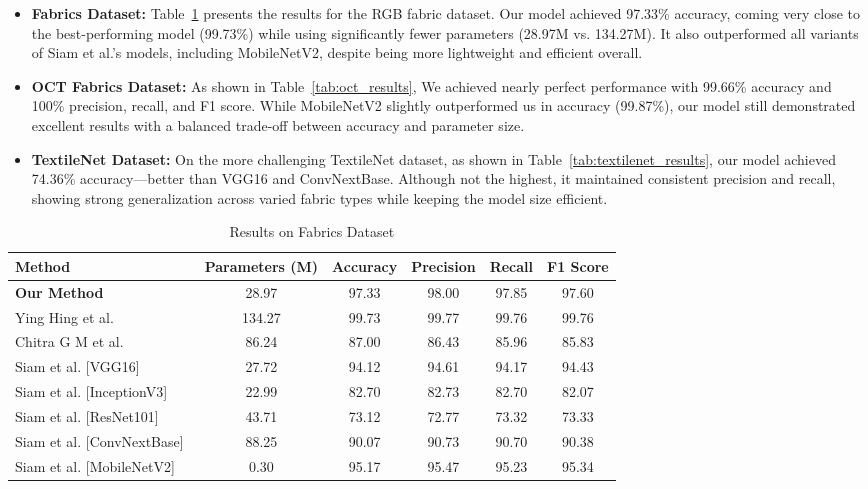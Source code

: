 \begin{itemize}[topsep=0pt, noitemsep]
    \item \textbf{Fabrics Dataset:} Table~\ref{tab:rgb_results} presents the results for the RGB fabric dataset. Our model achieved 97.33\% accuracy, coming very close to the best-performing model (99.73\%) while using significantly fewer parameters (28.97M vs. 134.27M). It also outperformed all variants of Siam et al.’s models, including MobileNetV2, despite being more lightweight and efficient overall.

    \item \textbf{OCT Fabrics Dataset:} As shown in Table~\ref{tab:oct_results}, We achieved nearly perfect performance with 99.66\% accuracy and 100\% precision, recall, and F1 score. While MobileNetV2 slightly outperformed us in accuracy (99.87\%), our model still demonstrated excellent results with a balanced trade-off between accuracy and parameter size.

    \item \textbf{TextileNet Dataset:} On the more challenging TextileNet dataset, as shown in Table~\ref{tab:textilenet_results}, our model achieved 74.36\% accuracy—better than VGG16 and ConvNextBase. Although not the highest, it maintained consistent precision and recall, showing strong generalization across varied fabric types while keeping the model size efficient.
\end{itemize}

\begin{table}[h]
\centering
\caption{Results on Fabrics Dataset}
\label{tab:rgb_results}
\begin{adjustbox}{max width=\textwidth}
\begin{tabular}{lccccc}
\toprule
\textbf{Method} & \textbf{Parameters (M)} & \textbf{Accuracy} & \textbf{Precision} & \textbf{Recall} & \textbf{F1 Score} \\
\midrule
\textbf{Our Method} & 28.97 & 97.33 & 98.00 & 97.85 & 97.60 \\
Ying Hing et al.~\cite{hong2024research} & 134.27 & 99.73 & 99.77 & 99.76 & 99.76 \\
Chitra G M et al.~\cite{chitra2023fabric} & 86.24 & 87.00 & 86.43 & 85.96 & 85.83 \\
Siam et al. [VGG16]~\cite{siam2023textilenet} & 27.72 & 94.12 & 94.61 & 94.17 & 94.43 \\
Siam et al. [InceptionV3]~\cite{siam2023textilenet} & 22.99 & 82.70 & 82.73 & 82.70 & 82.07 \\
Siam et al. [ResNet101]~\cite{siam2023textilenet} & 43.71 & 73.12 & 72.77 & 73.32 & 73.33 \\
Siam et al. [ConvNextBase]~\cite{siam2023textilenet} & 88.25 & 90.07 & 90.73 & 90.70 & 90.38 \\
Siam et al. [MobileNetV2]~\cite{siam2023textilenet} & 0.30 & 95.17 & 95.47 & 95.23 & 95.34 \\
\bottomrule
\end{tabular}
\end{adjustbox}
\end{table}

